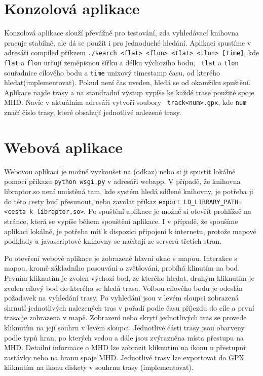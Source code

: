 \section{Konzolová aplikace}
Konzolová aplikace slouží převážně pro testování, zda vyhledávací knihovna
pracuje stabilně, ale dá se použít i pro jednoduché hledání. Aplikaci spustíme
v adresáři compiled příkzem {\tt ./search <flat> <flon> <tlat> <tlon> [time]},
kde {\tt flat} a {\tt flon} určují zeměpisnou šířku a délku výchozího bodu, {\tt
tlat} a {\tt tlon} souřadnice cílového bodu a {\tt time} unixový timestamp času,
od kterého hledat(\TODO implementovat). Pokud není čas uveden, hledá se od
okamžiku spuštění.  Aplikace najde trasy a na standradní výstup vypíše ke každé
trase použité spoje MHD. Navíc v aktuálním adresáři vytvoří soubory {\tt
track<num>.gpx}, kde {\tt num} značí číslo trasy, které obsahují jednotlivé
nalezené trasy.
 
\section{Webová aplikace}
Webovou aplikaci je možné vyzkoušet na (\TODO odkaz) nebo si ji spustit lokálně
pomocí příkazu {\tt python wsgi.py} v adresáři webapp. V případě, že knihovna
libraptor.so není umístěná tam, kde systém hledá sdílené knihovny, je potřeba ji
do této cesty buď přesunout, nebo zavolat příkaz {\tt export
LD\_LIBRARY\_PATH=<cesta k libraptor.so>}. Po spuštění aplikace je možné si
otevřít prohlížeč na stránce, která se vypíše během spouštění aplikace. I v
případě, že spoušíme aplikaci lokálně, je potřeba mít k dispozici připojení k
internetu, protože mapové podklady a javascriptové knihovny se načítají ze
serverů třetích stran.

Po otevření webové aplikace je zobrazené hlavní okno s mapou. Interakce s mapou,
kromě základního posouvání a zvětšování, probíhá klinutím na bod. Prvním
kliknutím je zvolen výchozí bod, ze kterého hledat, druhým kliknutím je zvolen
cílový bod do kterého se hledá trasa. Volbou cílového bodu je odeslán požadavek
na vyhledání trasy. Po vyhledání jsou v levém sloupci zobrazená shrnutí
jednotlivých nalezených tras v pořadí podle času příjezdu do cíle a první trasa
je zobrazena v mapě. Zobrazení nebo skrytí jednotlivých tras se provede
kliknutím na její souhrn v levém sloupci. Jednotlivé části trasy jsou obarveny
podle typů hran, po kterých vedou a dále jsou zvýrazněna místa přestupu na MHD.
Detailní informace o MHD lze zobrazit kliknutím na ikonu u přestupní zastávky
nebo na hranu spoje MHD. Jednotlivé trasy lze exportovat do GPX kliknutím na
ikonu diskety v souhrnu trasy (\TODO implementovat). 
